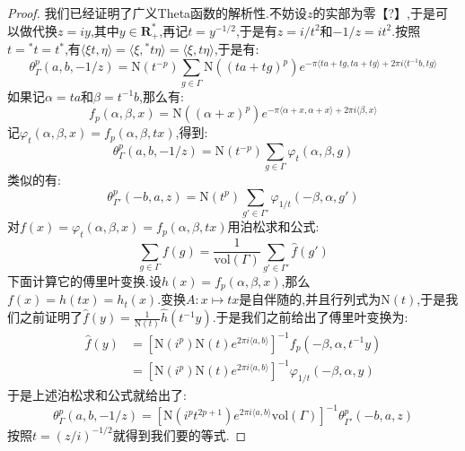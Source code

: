 \begin{enumerate}
\begin{proof}
    	我们已经证明了广义Theta函数的解析性.不妨设$z$的实部为零【?】,于是可以做代换$z=iy$,其中$y\in\textbf{R}_+^*$,再记$t=y^{-1/2}$,于是有$z=i/t^2$和$-1/z=it^2$.按照$t={^*t}=t^*$,有$\langle \xi t,\eta\rangle=\langle\xi,{^*t}\eta\rangle=\langle\xi,t\eta\rangle$,于是有:
    	$$\theta_{\Gamma}^p(a,b,-1/z)=\mathrm{N}(t^{-p})\sum_{g\in\Gamma}\mathrm{N}\left((ta+tg)^p\right)e^{-\pi\langle ta+tg,ta+tg\rangle+2\pi i\langle t^{-1}b,tg\rangle}$$
    	如果记$\alpha=ta$和$\beta=t^{-1}b$,那么有:
    	$$f_p(\alpha,\beta,x)=\mathrm{N}\left((\alpha+x)^p\right)e^{-\pi\langle\alpha+x,\alpha+x\rangle+2\pi i\langle\beta,x\rangle}$$
    	记$\varphi_t(\alpha,\beta,x)=f_p(\alpha,\beta,tx)$,得到:
    	$$\theta_{\Gamma}^p(a,b,-1/z)=\mathrm{N}(t^{-p})\sum_{g\in\Gamma}\varphi_t(\alpha,\beta,g)$$
    	类似的有:
    	$$\theta_{\Gamma'}^p(-b,a,z)=\mathrm{N}(t^p)\sum_{g'\in\Gamma'}\varphi_{1/t}(-\beta,\alpha,g')$$
    	对$f(x)=\varphi_t(\alpha,\beta,x)=f_p(\alpha,\beta,tx)$用泊松求和公式:
    	$$\sum_{g\in\Gamma}f(g)=\frac{1}{\mathrm{vol}(\Gamma)}\sum_{g'\in\Gamma'}\widehat{f}(g')$$
    	下面计算它的傅里叶变换.设$h(x)=f_p(\alpha,\beta,x)$,那么$f(x)=h(tx)=h_t(x)$.变换$A:x\mapsto tx$是自伴随的,并且行列式为$\mathrm{N}(t)$,于是我们之前证明了$\widehat{f}(y)=\frac{1}{\mathrm{N}(t)}\widehat{h}(t^{-1}y)$.于是我们之前给出了傅里叶变换为:
    	\begin{align*}
    		\widehat{f}(y)&=\left[\mathrm{N}(i^p)\mathrm{N}(t)e^{2\pi i\langle a,b\rangle}\right]^{-1}f_p(-\beta,\alpha,t^{-1}y)\\&=\left[\mathrm{N}(i^p)\mathrm{N}(t)e^{2\pi i\langle a,b\rangle}\right]^{-1}\varphi_{1/t}(-\beta,\alpha,y)
    	\end{align*}
    	于是上述泊松求和公式就给出了:
    	$$\theta_{\Gamma}^p(a,b,-1/z)=\left[\mathrm{N}(i^pt^{2p+1})e^{2\pi i\langle a,b\rangle}\mathrm{vol}(\Gamma)\right]^{-1}\theta_{\Gamma'}^p(-b,a,z)$$
    	按照$t=(z/i)^{-1/2}$就得到我们要的等式.
    \end{proof}
\end{enumerate}
